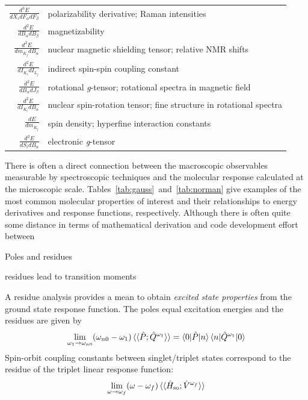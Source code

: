 \documentclass[%
class = book,%
crop = false,%
float = true,%
multi = true,%
preview = false,%
]{standalone}
\begin{document}
\begin{table}
\begin{singlespace}
\begin{tabulary}{0.85\textwidth}{rL}
      \(\frac{d^{3}E}{dX_{i}dF_{\alpha}dF_{\beta}}\) & polarizability derivative; Raman intensities \\
      \(\frac{d^{2}E}{dB_{\alpha}dB_{\beta}}\)       & magnetizability \\
      \(\frac{d^{2}E}{dm_{K_{j}}dB_{\alpha}}\)       & nuclear magnetic shielding tensor; relative NMR shifts \\
      \(\frac{d^{2}E}{dI_{K_{i}}dI_{L_{j}}}\)        & indirect spin-spin coupling constant \\
      \(\frac{d^{2}E}{dB_{\alpha}dJ_{\beta}}\)       & rotational \textit{g}-tensor; rotational spectra in magnetic field \\
      \(\frac{d^{2}E}{dI_{K_{i}}dB_{\alpha}}\)       & nuclear spin-rotation tensor; fine structure in rotational spectra \\
      \(\frac{dE}{dm_{K_{j}}}\)                      & spin density; hyperfine interaction constants \\
      \(\frac{d^{2}E}{dS_{i}dB_{\alpha}}\)           & electronic \textit{g}-tensor \\
      \bottomrule
    \end{tabulary}
  \end{singlespace}
\end{table}


There is often a direct connection between the macroscopic observables measurable by spectroscopic techniques and the molecular response calculated at the microscopic scale. Tables~\ref{tab:gauss}~and~\ref{tab:norman} give examples of the most common molecular properties of interest and their relationships to energy derivatives and response functions, respectively. Although there is often quite some distance in terms of mathematical derivation and code development effort between

Poles and residues

residues lead to transition moments

A residue analysis provides a mean to obtain \textit{excited state properties} from the ground state response function. The poles equal excitation energies and the residues are given by
\begin{equation*}
  \lim_{\omega_{1} \to \omega_{n0}} (\omega_{n0} - \omega_{1}) \braket{\braket{\hat{P};\hat{Q}^{\omega_{1}}}} = \braket{0|\hat{P}|n} \braket{n|\hat{Q}^{\omega_{1}}|0}
\end{equation*}
Spin-orbit coupling constants between singlet/triplet states correspond to the residue of the triplet linear response function:
\begin{equation*}
  \lim_{\omega \to \omega_{f}} (\omega - \omega_{f}) \braket{\braket{\hat{H}_{\text{so}};\hat{V}^{\omega_{f}}}}
\end{equation*}
\end{document}
